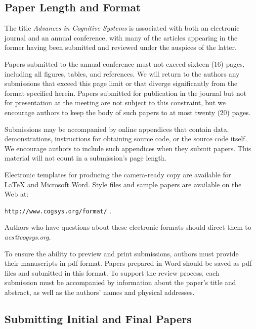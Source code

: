 \documentclass[11pt,letterpaper]{article}
\begin{document}
\subsection{Paper Length and Format}

The title {\it Advances in Cognitive Systems\/} is associated with
both an electronic journal and an annual conference, with many of the
articles appearing in the former having been submitted and reviewed
under the auspices of the latter. 

Papers submitted to the annual conference must not exceed sixteen (16)
pages, including all figures, tables, and references. We will return
to the authors any submissions that exceed this page limit or that
diverge significantly from the format specified herein.
Papers submitted for publication in the journal but not for presentation at 
the meeting are not subject to this constraint, but we encourage authors 
to keep the body of such papers to at most twenty (20) pages.


Submissions may be accompanied by online appendices that contain data,
demonstrations, instructions for obtaining source code, or the source
code itself. We encourage authors to include such appendices when they
submit papers. This material will not count in a submission's page
length.

Electronic templates for producing the camera-ready copy are available
for \LaTeX\/ and Microsoft Word. Style files and sample papers are 
available on the Web at: 
\vskip 0.1in
\begin{small}
\centerline{{\tt http://www.cogsys.org/format/} .}
\end{small}
\vskip 0.1in
\noindent
Authors who have questions about these electronic formats should direct
them to {\sl acs@cogsys.org}.

To ensure the ability to preview and print submissions, authors must
provide their manuscripts in pdf format. Papers prepared in Word
should be saved as pdf files and submitted in this format. To support
the review process, each submission must be accompanied by information
about the paper's title and abstract, as well as the authors' names
and physical addresses. 

\subsection{Submitting Initial and Final Papers}
\end{document}
